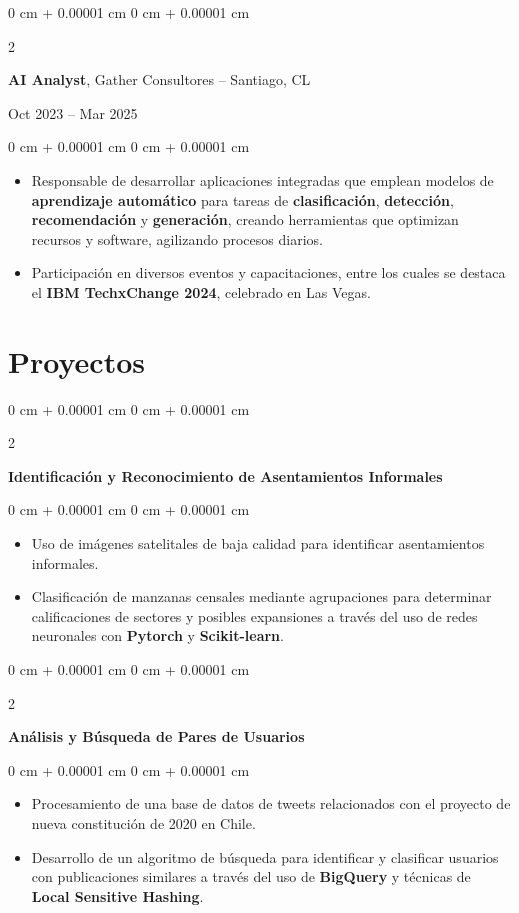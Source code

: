 \documentclass[10pt, letterpaper]{article}
\newenvironment{highlights}{
    \begin{itemize}[
        topsep=0.10 cm,
        parsep=0.10 cm,
        partopsep=0pt,
        itemsep=0pt,
        leftmargin=0 cm + 10pt
    ]
}{
    \end{itemize}
} %
\newenvironment{onecolentry}{
    \begin{adjustwidth}{
        0 cm + 0.00001 cm
    }{
        0 cm + 0.00001 cm
    }
}{
    \end{adjustwidth}
} %
\newenvironment{twocolentry}[2][]{
    \onecolentry
    \def\secondColumn{#2}
    \setcolumnwidth{\fill, 4.5 cm}
    \begin{paracol}{2}
}{
    \switchcolumn \raggedleft \secondColumn
    \end{paracol}
    \endonecolentry
} %
\begin{document}
\begin{twocolentry}{Oct 2023 – Mar 2025}
    \textbf{AI Analyst}, Gather Consultores -- Santiago, CL
\end{twocolentry}

\vspace{0.10 cm}
\begin{onecolentry}
    \begin{highlights}
    \item Responsable de desarrollar aplicaciones integradas que emplean modelos de \textbf{aprendizaje automático} para tareas de \textbf{clasificación}, \textbf{detección}, \textbf{recomendación} y \textbf{generación}, creando herramientas que optimizan recursos y software, agilizando procesos diarios.
    \item Participación en diversos eventos y capacitaciones, entre los cuales se destaca el \textbf{IBM TechxChange 2024}, celebrado en Las Vegas.
    \end{highlights}
\end{onecolentry}

\section{Proyectos}

\begin{twocolentry}{
}
    \textbf{Identificación y Reconocimiento de Asentamientos Informales}
\end{twocolentry}

\vspace{0.10 cm}
\begin{onecolentry}
    \begin{highlights}
    \item Uso de imágenes satelitales de baja calidad para identificar asentamientos informales.
    \item Clasificación de manzanas censales mediante agrupaciones para determinar calificaciones de sectores y posibles expansiones a través del uso de redes neuronales con \textbf{Pytorch} y \textbf{Scikit-learn}.
    \end{highlights}
\end{onecolentry}
\vspace{0.2 cm}
\begin{twocolentry}{
}

    \textbf{Análisis y Búsqueda de Pares de Usuarios}
\end{twocolentry}

\vspace{0.10 cm}
\begin{onecolentry}
    \begin{highlights}
    \item Procesamiento de una base de datos de tweets relacionados con el proyecto de nueva constitución de 2020 en Chile.
    \item Desarrollo de un algoritmo de búsqueda para identificar y clasificar usuarios con publicaciones similares a través del uso de \textbf{BigQuery} y técnicas de \textbf{Local Sensitive Hashing}.
    \end{highlights}
\end{onecolentry}
\vspace{0.2 cm}
\end{document}
